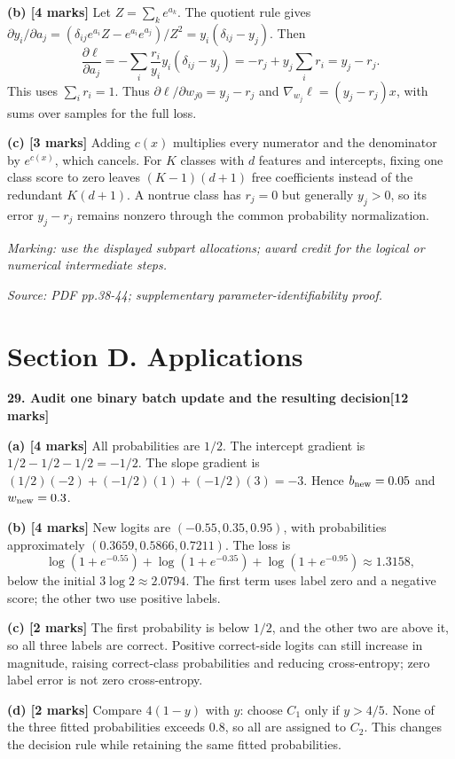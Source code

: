\documentclass[11pt,a4paper]{article}
\begin{document}
\textbf{(b) [4 marks]} Let \(Z=\sum_k e^{a_k}\). The quotient rule gives \(\partial y_i/\partial a_j=(\delta_{ij}e^{a_i}Z-e^{a_i}e^{a_j})/Z^2=y_i(\delta_{ij}-y_j)\). Then \[\frac{\partial\ell}{\partial a_j}=-\sum_i\frac{r_i}{y_i}y_i(\delta_{ij}-y_j)=-r_j+y_j\sum_i r_i=y_j-r_j.\] This uses \(\sum_i r_i=1\). Thus \(\partial\ell/\partial w_{j0}=y_j-r_j\) and \(\nabla_{w_j}\ell=(y_j-r_j)x\), with sums over samples for the full loss.

\textbf{(c) [3 marks]} Adding \(c(x)\) multiplies every numerator and the denominator by \(e^{c(x)}\), which cancels. For \(K\) classes with \(d\) features and intercepts, fixing one class score to zero leaves \((K-1)(d+1)\) free coefficients instead of the redundant \(K(d+1)\). A nontrue class has \(r_j=0\) but generally \(y_j>0\), so its error \(y_j-r_j\) remains nonzero through the common probability normalization.

\textit{Marking: use the displayed subpart allocations; award credit for the logical or numerical intermediate steps.}\par
{\footnotesize\textit{Source: PDF pp.38-44; supplementary parameter-identifiability proof.}}
\newpage\section*{Section D. Applications}
\textbf{29. Audit one binary batch update and the resulting decision}\hfill\textbf{[12 marks]}\par\medskip
\textbf{(a) [4 marks]} All probabilities are \(1/2\). The intercept gradient is \(1/2-1/2-1/2=-1/2\). The slope gradient is \((1/2)(-2)+(-1/2)(1)+(-1/2)(3)=-3\). Hence \(b_{\rm new}=0.05\) and \(w_{\rm new}=0.3\).

\textbf{(b) [4 marks]} New logits are \((-0.55,0.35,0.95)\), with probabilities approximately \((0.3659,0.5866,0.7211)\). The loss is \[\log(1+e^{-0.55})+\log(1+e^{-0.35})+\log(1+e^{-0.95})\approx1.3158,\] below the initial \(3\log2\approx2.0794\). The first term uses label zero and a negative score; the other two use positive labels.

\textbf{(c) [2 marks]} The first probability is below \(1/2\), and the other two are above it, so all three labels are correct. Positive correct-side logits can still increase in magnitude, raising correct-class probabilities and reducing cross-entropy; zero label error is not zero cross-entropy.

\textbf{(d) [2 marks]} Compare \(4(1-y)\) with \(y\): choose \(C_1\) only if \(y>4/5\). None of the three fitted probabilities exceeds \(0.8\), so all are assigned to \(C_2\). This changes the decision rule while retaining the same fitted probabilities.
\end{document}
